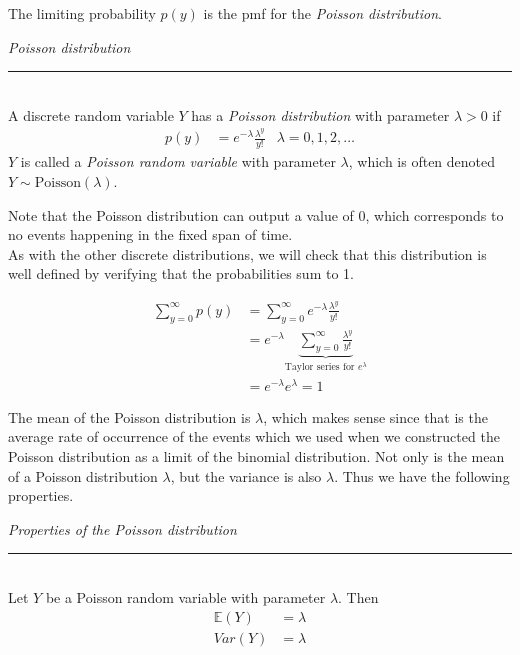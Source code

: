 \documentclass[12pt]{article}
\theoremstyle{definition}
\theoremstyle{remark}
\def\E{{\mathbb E}}
\begin{document}
The limiting probability $p(y)$ is the pmf for the \emph{Poisson distribution}.

\begin{framed}
\emph{Poisson distribution}\\
  \rule{\dimexpr{}\fboxrule}{.1pt} \\
A discrete random variable $Y$ has a \emph{Poisson distribution} with parameter $\lambda > 0$ if 
\begin{align*}
p(y) &= e^{-\lambda}\frac{\lambda^y}{y!} &\lambda = 0, 1, 2, \dots
\end{align*}
$Y$ is called a \emph{Poisson random variable} with parameter $\lambda$, which is often denoted $Y\sim\text{Poisson}(\lambda)$.
\end{framed}
Note that the Poisson distribution can output a value of 0, which corresponds to no events happening in the fixed span of time.\\

As with the other discrete distributions, we will check that this distribution is well defined by verifying that the probabilities sum to 1.

\begin{align*}
\sum_{y=0}^\infty p(y) &= \sum_{y=0}^\infty e^{-\lambda}\frac{\lambda^y}{y!} \\
&= e^{-\lambda} \underbrace{\sum_{y=0}^\infty \frac{\lambda^y}{y!}}_{\text{Taylor series for }e^{\lambda}}\\
&= e^{-\lambda}e^{\lambda} = 1
\end{align*}

The mean of the Poisson distribution is $\lambda$, which makes sense since that is the average rate of occurrence of the events which we used when we constructed the Poisson distribution as a limit of the binomial distribution. Not only is the mean of a Poisson distribution $\lambda$, but the variance is also $\lambda$. Thus we have the following properties.

\begin{framed}
\emph{Properties of the Poisson distribution}\\
  \rule{\dimexpr{}\fboxrule}{.1pt} \\
Let $Y$ be a Poisson random variable with parameter $\lambda$. Then
\begin{align*}
\E(Y) &= \lambda \\
Var(Y) &= \lambda
\end{align*}
\end{framed}
\end{document}
